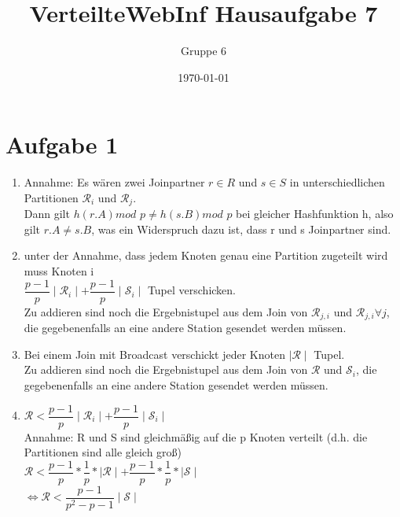 \documentclass[a4paper]{article}
\author{Gruppe 6}
\title{\textbf{VerteilteWebInf Hausaufgabe 7}}
\date{\today}
\begin{document}
\maketitle


\section*{Aufgabe 1}
\begin{enumerate}[label=\alph*)]
\item Annahme: Es wären zwei Joinpartner $ r \in R $ und $ s \in S $ in unterschiedlichen Partitionen $ \mathcal{R}_i $ und $ \mathcal{R}_j $.\\
Dann gilt $ h(r.A) mod $  $p \neq h(s.B) mod $  $ p $ bei gleicher Hashfunktion h, also gilt $ r.A \neq s.B $, was ein Widerspruch dazu ist, dass r und s Joinpartner sind. 
\item unter der Annahme, dass jedem Knoten genau eine Partition zugeteilt wird muss Knoten i \\
$ \dfrac{p-1}{p} \mid \mathcal{R}_i \mid + \dfrac{p-1}{p} \mid \mathcal{S}_i \mid $ Tupel verschicken.\\
Zu addieren sind noch die Ergebnistupel aus dem Join von $ \mathcal{R}_{j,i} $ und $ \mathcal{R}_{j,i} \forall j$, die gegebenenfalls an eine andere Station gesendet werden müssen.
\item Bei einem Join mit Broadcast verschickt jeder Knoten $ \mid \mathcal{R} \mid $ Tupel.\\
Zu addieren sind noch die Ergebnistupel aus dem Join von $ \mathcal{R} $ und $ \mathcal{S}_{i} $, die gegebenenfalls an eine andere Station gesendet werden müssen.
\item $ \mathcal{R} < \dfrac{p-1}{p} \mid \mathcal{R}_i \mid + \dfrac{p-1}{p} \mid \mathcal{S}_i \mid $\\
Annahme: R und S sind gleichmäßig auf die p Knoten verteilt (d.h. die Partitionen sind alle gleich groß)\\
$ \mathcal{R} < \dfrac{p-1}{p} * \dfrac{1}{p} * \mid \mathcal{R} \mid + \dfrac{p-1}{p}*  \dfrac{1}{p} * \mid \mathcal{S} \mid $\\
$ \Longleftrightarrow \mathcal{R} < \dfrac{p-1}{p^2-p-1} \mid \mathcal{S} \mid $

\end{enumerate}
\end{document}
